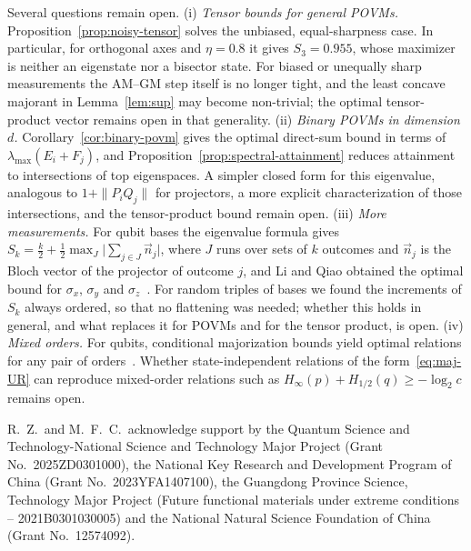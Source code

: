 \documentclass[aps,pra,twocolumn,superscriptaddress,nofootinbib,floatfix]{revtex4-2}
\theoremstyle{definition}
\begin{document}
Several questions remain open.
(i) \emph{Tensor bounds for general POVMs.}
Proposition~\ref{prop:noisy-tensor} solves the unbiased, equal-sharpness case.
In particular, for orthogonal axes and $\eta=0.8$ it gives $S_3=0.955$, whose
maximizer is neither an eigenstate nor a bisector state. For biased or unequally
sharp measurements the AM--GM step itself is no longer tight, and the least
concave majorant in Lemma~\ref{lem:sup} may become non-trivial; the optimal
tensor-product vector remains open in that generality.
(ii) \emph{Binary POVMs in dimension $d$.} Corollary~\ref{cor:binary-povm} gives
the optimal direct-sum bound in terms of $\lambda_{\max}(E_i+F_j)$, and
Proposition~\ref{prop:spectral-attainment} reduces attainment to intersections of
top eigenspaces. A simpler closed form for this eigenvalue, analogous to
$1+\|P_iQ_j\|$ for projectors, a more explicit characterization of those
intersections, and the tensor-product bound remain open.
(iii) \emph{More measurements.} For qubit bases the eigenvalue formula gives
$S_k=\frac k2+\frac12\max_J\bigl|\sum_{j\in J}\vec n_j\bigr|$, where $J$ runs
over sets of $k$ outcomes and $\vec n_j$ is the Bloch vector of the projector
of outcome $j$, and Li and Qiao obtained the optimal bound for $\sigma_x$,
$\sigma_y$ and $\sigma_z$~\cite{LiQiao2019}. For random triples of bases we
found the increments of $S_k$ always ordered, so that no flattening was needed;
whether this holds in general, and what replaces it for POVMs and for the
tensor product, is open.
(iv) \emph{Mixed orders.} For qubits, conditional majorization bounds yield
optimal relations for any pair of orders~\cite{XiaoFangGour2019}. Whether
state-independent relations of the form~\eqref{eq:maj-UR} can reproduce
mixed-order relations such as $H_\infty(p)+H_{1/2}(q)\ge-\log_2c$ remains
open.
\begin{acknowledgments}
R.~Z.\ and M.~F.~C.\ acknowledge support by the Quantum Science and
Technology-National Science and Technology Major Project (Grant
No.~2025ZD0301000), the National Key Research and Development Program of China
(Grant No.~2023YFA1407100), the Guangdong Province Science, Technology Major
Project (Future functional materials under extreme conditions --
2021B0301030005) and the National Natural Science Foundation of China (Grant
No.~12574092).
\end{acknowledgments}

\appendix

\end{document}
